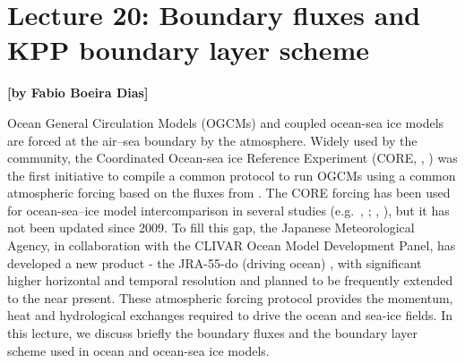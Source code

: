 
\section{Lecture 20: Boundary fluxes and KPP boundary layer scheme}
\begin{flushright}\textbf{[by Fabio Boeira Dias]}\end{flushright}

Ocean General Circulation Models (OGCMs) and coupled ocean-sea ice models are forced at the air--sea boundary by the atmosphere. Widely used by the community, the Coordinated Ocean-sea ice Reference Experiment (CORE, \citeauthor{Griffies2009}, \citeyear{ Griffies2009}) was the first initiative to compile a common protocol to run OGCMs using a common atmospheric forcing based on the fluxes from \cite{Large2004}. The CORE forcing has been used for ocean-sea--ice model intercomparison in several studies (e.g.\ \citeauthor{Danabasoglu2014}, \citeyear{Danabasoglu2014}; \citeauthor{Downes2015}, \citeyear{Downes2015}), but it has not been updated since 2009. To fill this gap, the Japanese Meteorological Agency, in collaboration with the CLIVAR Ocean Model Development Panel, has developed a new product -  the JRA-55-do (driving ocean) \citep{Tsujino2018}, with significant higher horizontal and temporal resolution and planned to be frequently extended to the near present. These atmospheric forcing protocol provides the momentum, heat and hydrological exchanges required to drive the ocean and sea-ice fields. In this lecture, we discuss briefly the boundary fluxes and the boundary layer scheme used in ocean and ocean-sea ice models.\\

